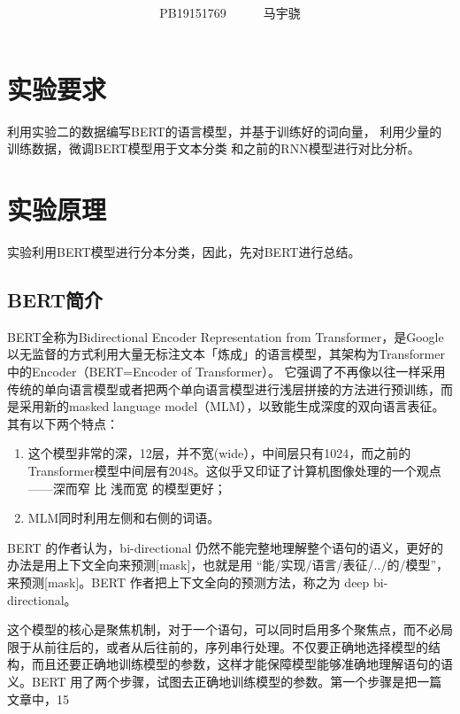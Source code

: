 \documentclass[a4paper,AutoFakeBold,AutoFakeSlant]{ctexart}
\title{\textbf{\textsf{\heiti{深度学习Lab3实验报告}}}}
\author{\ssong PB19151769~~~~~~马宇骁}
\date{}
\makeatletter
\renewcommand{\abstractname}{}    %
\renewenvironment{abstract}{%
      \if@twocolumn
        \section*{\abstractname}%
      \else
        \small
        \begin{center}%
          {\bfseries \abstractname\vspace{-.5em}\vspace{\z@}}%
        \end{center}%
      \fi}
      {}
\makeatother
\begin{document}
\maketitle



\section{实验要求}
利用实验二的数据编写BERT的语言模型，并基于训练好的词向量，
利用少量的训练数据，微调BERT模型用于文本分类
和之前的RNN模型进行对比分析。


\section{实验原理}
实验利用BERT模型进行分本分类，因此，先对BERT进行总结。

\subsection{BERT简介}
BERT全称为Bidirectional Encoder Representation from Transformer，是Google以无监督的方式利用大量无标注文本「炼成」的语言模型，其架构为Transformer中的Encoder（BERT=Encoder of Transformer）。
它强调了不再像以往一样采用传统的单向语言模型或者把两个单向语言模型进行浅层拼接的方法进行预训练，而是采用新的masked language model（MLM），以致能生成深度的双向语言表征。
其有以下两个特点：
\begin{enumerate}
    \item 这个模型非常的深，12层，并不宽(wide），中间层只有1024，而之前的Transformer模型中间层有2048。这似乎又印证了计算机图像处理的一个观点——深而窄 比 浅而宽 的模型更好；
    \item MLM同时利用左侧和右侧的词语。
\end{enumerate}

BERT 的作者认为，bi-directional 仍然不能完整地理解整个语句的语义，更好的办法是用上下文全向来预测[mask]，也就是用 “能/实现/语言/表征/../的/模型”，来预测[mask]。BERT 作者把上下文全向的预测方法，称之为 deep bi-directional。

这个模型的核心是聚焦机制，对于一个语句，可以同时启用多个聚焦点，而不必局限于从前往后的，或者从后往前的，序列串行处理。不仅要正确地选择模型的结构，而且还要正确地训练模型的参数，这样才能保障模型能够准确地理解语句的语义。BERT 用了两个步骤，试图去正确地训练模型的参数。第一个步骤是把一篇文章中，15%
\end{document}
